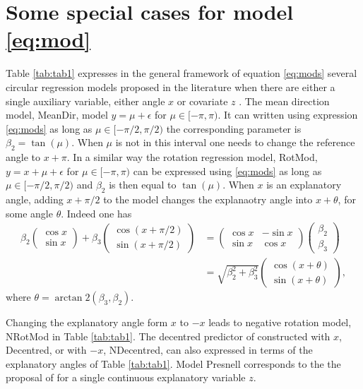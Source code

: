 \section{Some special cases for model \eqref{eq:mod}}
Table \ref{tab:tab1} expresses in the general framework of equation \eqref{eq:mods} several circular regression models proposed in the literature when there are either a single auxiliary variable, either angle $x$ or covariate $z$ . The mean direction model, MeanDir, model $y = \mu+ \epsilon$ for $\mu \in [-\pi,\pi)$. It can written using expression \eqref{eq:mods} as long as $\mu \in [-\pi/2,\pi/2)$ the corresponding parameter is $\beta_2=\tan(\mu)$.  When $\mu$ is not in this interval one needs to change the reference angle to $x +\pi$. In a similar way the rotation regression model, RotMod, $y = x+ \mu+ \epsilon$ for $\mu \in [-\pi,\pi)$ can be expressed using
\eqref{eq:mods} as long as $\mu \in [-\pi/2,\pi/2)$ and $\beta_2$ is then equal to $\tan(\mu)$. When $x$ is an explanatory angle, adding $x+\pi/2$ to the model changes the explanaotry angle into $x+\theta$, for some angle $\theta$.  Indeed one has
\begin{align*}
\beta_2 \begin{pmatrix} \cos x \\ \sin x \end{pmatrix}+\beta_3 \begin{pmatrix} \cos (x+\pi/2) \\ \sin (x+\pi/2) \end{pmatrix} & =
 \begin{pmatrix} \cos x & -\sin x \\ \sin x &\cos x \end{pmatrix}\begin{pmatrix} \beta_2 \\ \beta_3 \end{pmatrix} \\
 &= \sqrt{\beta_2^2+\beta_3^2}\begin{pmatrix} \cos (x+\theta) \\ \sin (x+\theta) \end{pmatrix},
\end{align*}
where $\theta = \arctan2(\beta_3,\beta_2)$.

Changing the explanatory angle form $x$ to $-x$ leads to negative rotation model,  NRotMod in Table \ref{tab:tab1}.  The decentred predictor of \citet{Rivest97} constructed with $x$, Decentred, or with $-x$, NDecentred, can also expressed in terms of the explanatory angles of Table \ref{tab:tab1}.  Model Presnell corresponds to the the proposal of \cite{Presnell98}  for a single continuous explanatory variable $z$.

